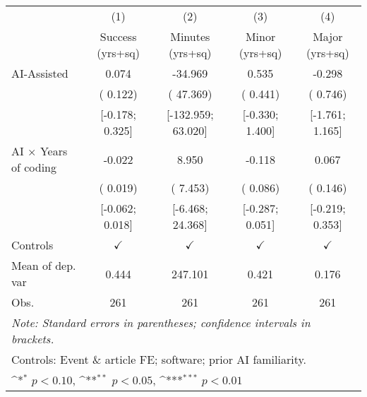\def\sym#1{\ifmmode^{#1}\else\(^{#1}\)\fi}
\begin{tabular}{l*{4}{c}}
\hline\hline
 & (1) & (2) & (3) & (4)
\\
 & Success (yrs+sq) & Minutes (yrs+sq) & Minor (yrs+sq) & Major (yrs+sq)
 \\
\hline
AI-Assisted &  0.074 & -34.969 &  0.535 & -0.298
\\
 & ( 0.122) & ( 47.369) & ( 0.441) & ( 0.746)
\\
 & [-0.178;  0.325] & [-132.959;  63.020] & [-0.330;  1.400] & [-1.761;  1.165]
\\
AI × Years of coding & -0.022 &  8.950 & -0.118 &  0.067
\\
 & ( 0.019) & ( 7.453) & ( 0.086) & ( 0.146)
\\
 & [-0.062;  0.018] & [-6.468;  24.368] & [-0.287;  0.051] & [-0.219;  0.353]
\\
\hline
Controls & $\checkmark$ & $\checkmark$ & $\checkmark$ & $\checkmark$
\\
Mean of dep. var &  0.444 &  247.101 &  0.421 &  0.176
\\
Obs. & 261 & 261 & 261 & 261
\\
\hline
\hline\hline
\multicolumn{5}{l}{\it{Note:} Standard errors in parentheses; confidence intervals in brackets.}\\
\multicolumn{5}{l}{Controls: Event \& article FE; software; prior AI familiarity.}\\
\multicolumn{5}{l}{\sym{*} $p<0.10$, \sym{**} $p<0.05$,  \sym{***} $p<0.01$}\\
\end{tabular}
